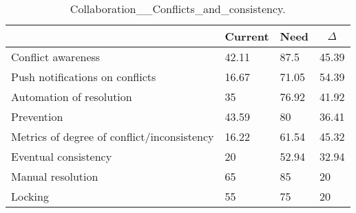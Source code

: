 
  \begin{table*}[]
  \centering
  \notsotiny
  \caption{ Collaboration__Conflicts_and_consistency.}
\label{tab:collaboration__conflicts_and_consistency}
\begin{tabular}{|l|l|l|l|}
  \hline
  \rowcolor[HTML]{C0C0C0}
    \multicolumn{1}{|c|}{Feature} & \multicolumn{1}{c|}{Current} & \multicolumn{1}{c|}{Need} & \multicolumn{1}{c|}{$\Delta$} \\ \hline
  Conflict awareness & 42.11 & 87.5 & 45.39 \\ \hline 
Push notifications on conflicts & 16.67 & 71.05 & 54.39 \\ \hline 
Automation of resolution & 35 & 76.92 & 41.92 \\ \hline 
Prevention & 43.59 & 80 & 36.41 \\ \hline 
Metrics of degree of conflict/inconsistency & 16.22 & 61.54 & 45.32 \\ \hline 
Eventual consistency & 20 & 52.94 & 32.94 \\ \hline 
Manual resolution & 65 & 85 & 20 \\ \hline 
Locking & 55 & 75 & 20 \\ \hline 
\end{tabular}%
  \end{table*}